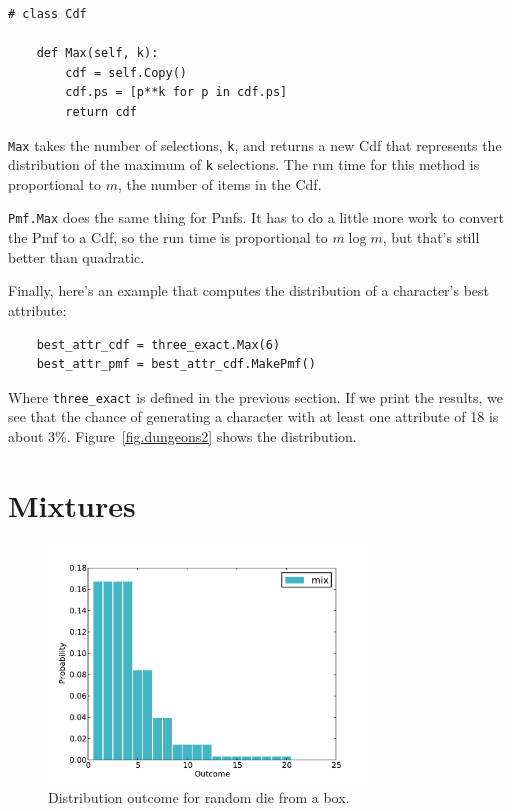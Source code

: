 \documentclass[12pt]{book}
\begin{document}
\begin{verbatim}
# class Cdf

    def Max(self, k):
        cdf = self.Copy()
        cdf.ps = [p**k for p in cdf.ps]
        return cdf
\end{verbatim}

\verb"Max" takes the number of selections, {\tt k}, and returns a new
Cdf that represents the distribution of the maximum of {\tt k}
selections.  The run time for this method is proportional to 
$m$, the number of items in the Cdf.

\verb"Pmf.Max" does the same thing for Pmfs.  It has to do a little
more work to convert the Pmf to a Cdf, so the run time is proportional
to $m \log m$, but that's still better than quadratic.

Finally, here's an example that computes the distribution of
a character's best attribute:

\begin{verbatim}
    best_attr_cdf = three_exact.Max(6)
    best_attr_pmf = best_attr_cdf.MakePmf()
\end{verbatim}

Where \verb"three_exact" is defined in the previous section.
If we print the results, we see that the chance of generating
a character with at least one attribute of 18 is about 3\%.
Figure~\ref{fig.dungeons2} shows the distribution.


\section{Mixtures}

\begin{figure}
\centerline{\includegraphics[height=2.5in]{figs/dungeons3.pdf}}
\caption{Distribution outcome for random die from a box.}
\label{fig.dungeons3}
\end{figure}
\end{document}
